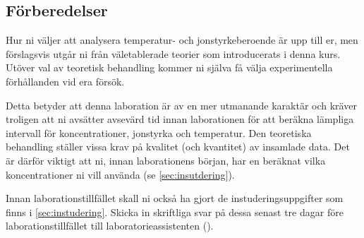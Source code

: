\subsection{Förberedelser}
Hur ni väljer att analysera temperatur- och jonstyrkeberoende är
upp till er, men förslagsvis utgår ni från väletablerade
teorier som introducerats i denna kurs. Utöver val av teoretisk behandling
kommer ni själva få välja experimentella förhållanden vid era försök.

Detta betyder att denna laboration är av en mer utmanande karaktär och
kräver troligen att ni avsätter avsevärd tid innan laborationen för att
beräkna lämpliga intervall för koncentrationer, jonstyrka och
temperatur. Den teoretiska behandling ställer vissa krav på kvalitet (och
kvantitet) av insamlade data. Det är därför viktigt att ni, innan
laborationens början, har en beräknat vilka koncentrationer ni vill
använda (se \cref{sec:insutdering}).

Innan laborationstillfället skall ni också ha gjort de
instuderingsuppgifter som finns i \cref{sec:instudering}. Skicka in
skriftliga svar på dessa senast tre dagar före laborationstillfället till
laboratorieassistenten (\mailto).

